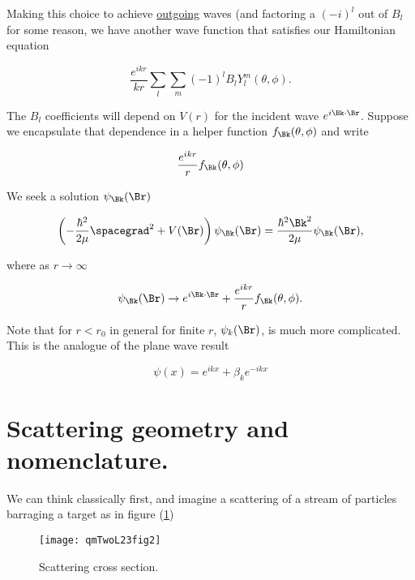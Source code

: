 Making this choice to achieve \underline{outgoing} waves (and factoring a $(-i)^l$ out of $B_l$ for some reason, we have another wave function that satisfies our Hamiltonian equation

\begin{equation}\label{eqn:qmTwoL23:560}
\frac{e^{i k r}}{k r}
\sum_l
\sum_m
(-1)^l
B_l
Y_l^m(\theta, \phi).
\end{equation}

The $B_l$ coefficients will depend on $V(r)$ for the incident wave $e^{i \Bk \cdot \Br}$.  Suppose we encapsulate that dependence in a helper function $f_\Bk(\theta, \phi)$ and write

\begin{equation}\label{eqn:qmTwoL23:580}
\frac{e^{i k r}}{r} f_\Bk(\theta, \phi)
\end{equation}

We seek a solution $\psi_\Bk(\Br)$

\begin{equation}\label{eqn:qmTwoL23:60b}
\left( - \frac{\hbar^2}{2\mu} \spacegrad^2
+ V(\Br)
\right)
\psi_\Bk(\Br)
 = \frac{\hbar^2 \Bk^2}{2 \mu}
\psi_\Bk(\Br),
\end{equation}

where as $r \rightarrow \infty$

\begin{equation}\label{eqn:qmTwoL23:600}
\psi_\Bk(\Br) \rightarrow e^{i \Bk \cdot \Br} + \frac{e^{i k r}}{r} f_\Bk(\theta, \phi).
\end{equation}

Note that for $r < r_0$ in general for finite $r$, $\psi_k(\Br)$, is much more complicated.  This is the analogue of the plane wave result

\begin{equation}\label{eqn:qmTwoL23:620}
\psi(x) = e^{i k x} + \beta_k e^{-i k x}
\end{equation}


\section{Scattering geometry and nomenclature.}

We can think classically first, and imagine a scattering of a stream of particles barraging a target as in
figure (\ref{fig:qmTwoL23:qmTwoL23fig2})

\begin{figure}[htp]
   \centering
   \texttt{[image: qmTwoL23fig2]}
   \caption{Scattering cross section.}\label{fig:qmTwoL23:qmTwoL23fig2}
\end{figure}

